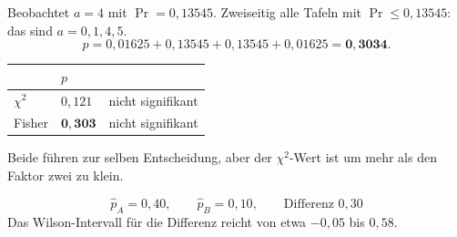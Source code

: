 \begin{aufgabe}
Beobachtet $a = 4$ mit $\Pr = 0{,}13545$. Zweiseitig alle Tafeln mit $\Pr \le 0{,}13545$: das sind $a = 0, 1, 4, 5$.
\[ p = 0{,}01625 + 0{,}13545 + 0{,}13545 + 0{,}01625 = \mathbf{0{,}3034} . \]

\begin{center}
\renewcommand{\arraystretch}{1.48}
\begin{tabular}{@{}P{2.4cm}P{2.0cm}P{2.8cm}@{}}
\toprule
& $p$ & \\
\midrule
$\chi^2$ & $0{,}121$ & nicht signifikant\\
Fisher & $\mathbf{0{,}303}$ & nicht signifikant\\
\bottomrule
\end{tabular}
\end{center}

Beide führen zur selben Entscheidung, aber der $\chi^2$-Wert ist um mehr als den Faktor zwei zu klein.

\[ \hat p_A = 0{,}40, \qquad \hat p_B = 0{,}10, \qquad \text{Differenz } 0{,}30 \]
Das Wilson-Intervall für die Differenz reicht von etwa $-0{,}05$ bis $0{,}58$.

\begin{center}
\begin{minipage}{0.86\textwidth}
\end{minipage}
\end{center}
\end{aufgabe}

